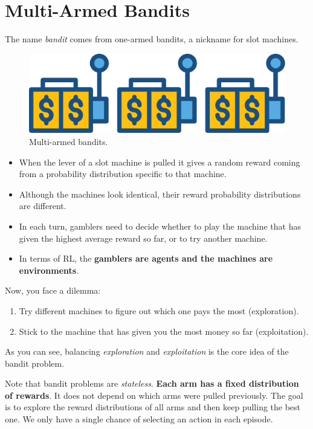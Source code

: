 \section{Multi-Armed Bandits}
The name \textit{bandit} comes from one-armed bandits, a nickname for slot machines.
\begin{figure}[h]
	\centering
	\includegraphics[scale=0.3]{./images/slot.pdf}
	\caption{Multi-armed bandits.}
\end{figure}
\begin{itemize}
	\item When the lever of a slot machine is pulled it gives a random reward coming from a probability distribution specific to that machine.
	\item Although the machines look identical, their reward probability distributions are different. 
	\item In each turn, gamblers need to decide whether to play the machine that has given the highest average reward so far, or to try another machine. 
	\item In terms of RL, the \textbf{gamblers are agents and the machines are environments}. 
\end{itemize}

Now, you face a dilemma:
\begin{enumerate}
	\item Try different machines to figure out which one pays the most (exploration).
	\item Stick to the machine that has given you the most money so far (exploitation).
\end{enumerate}
As you can see, balancing \textit{exploration} and \textit{exploitation} is the core idea of the bandit problem.

Note that bandit problems are \textit{stateless}. \textbf{Each arm has a fixed distribution of rewards}. It does not depend on which arms were pulled previously. The goal is to explore the reward distributions of all arms and then keep pulling the best one. We only have a single chance of selecting an action in each episode. 

